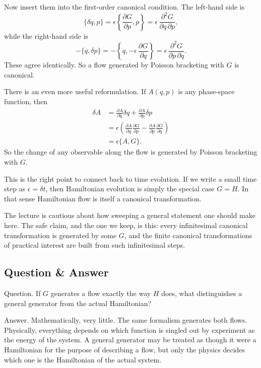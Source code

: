 Now insert them into the first-order canonical condition. The left-hand side is
\[
\{\delta q,p\}
=\epsilon\left\{\frac{\partial G}{\partial p},p\right\}
=\epsilon\,\frac{\partial^2 G}{\partial q\,\partial p},
\]
while the right-hand side is
\[
-\{q,\delta p\}
=-\left\{q,-\epsilon\,\frac{\partial G}{\partial q}\right\}
=\epsilon\,\frac{\partial^2 G}{\partial p\,\partial q}.
\]
These agree identically. So a flow generated by Poisson bracketing with \(G\) is canonical.

There is an even more useful reformulation. If \(A(q,p)\) is any phase-space function, then
\begin{align}
\delta A
&=\frac{\partial A}{\partial q}\delta q+\frac{\partial A}{\partial p}\delta p \\
&=\epsilon\left(\frac{\partial A}{\partial q}\frac{\partial G}{\partial p}
-\frac{\partial A}{\partial p}\frac{\partial G}{\partial q}\right) \\
&=\epsilon\{A,G\}.
\end{align}
So the change of any observable along the flow is generated by Poisson bracketing with \(G\).

This is the right point to connect back to time evolution. If we write a small time step as \(\epsilon=\delta t\), then Hamiltonian evolution is simply the special case \(G=H\). In that sense Hamiltonian flow is itself a canonical transformation.

The lecture is cautious about how sweeping a general statement one should make here. The safe claim, and the one we keep, is this: every infinitesimal canonical transformation is generated by some \(G\), and the finite canonical transformations of practical interest are built from such infinitesimal steps.

\subsection{Question \& Answer}

Question. If \(G\) generates a flow exactly the way \(H\) does, what distinguishes a general generator from the actual Hamiltonian?

Answer. Mathematically, very little. The same formalism generates both flows. Physically, everything depends on which function is singled out by experiment as the energy of the system. A general generator may be treated as though it were a Hamiltonian for the purpose of describing a flow, but only the physics decides which one is the Hamiltonian of the actual system.

